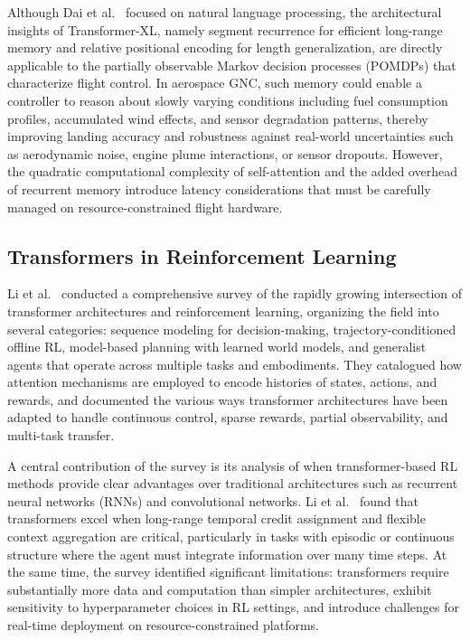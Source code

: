 \documentclass[10pt,twocolumn]{article}
\begin{document}
Although Dai et al.~\cite{dai2019} focused on natural language processing, the architectural insights of Transformer-XL, namely segment recurrence for efficient long-range memory and relative positional encoding for length generalization, are directly applicable to the partially observable Markov decision processes (POMDPs) that characterize flight control.
In aerospace GNC, such memory could enable a controller to reason about slowly varying conditions including fuel consumption profiles, accumulated wind effects, and sensor degradation patterns, thereby improving landing accuracy and robustness against real-world uncertainties such as aerodynamic noise, engine plume interactions, or sensor dropouts.
However, the quadratic computational complexity of self-attention and the added overhead of recurrent memory introduce latency considerations that must be carefully managed on resource-constrained flight hardware.

\subsection{Transformers in Reinforcement Learning}

Li et al.~\cite{li2023} conducted a comprehensive survey of the rapidly growing intersection of transformer architectures and reinforcement learning, organizing the field into several categories: sequence modeling for decision-making, trajectory-conditioned offline RL, model-based planning with learned world models, and generalist agents that operate across multiple tasks and embodiments.
They catalogued how attention mechanisms are employed to encode histories of states, actions, and rewards, and documented the various ways transformer architectures have been adapted to handle continuous control, sparse rewards, partial observability, and multi-task transfer.

A central contribution of the survey is its analysis of when transformer-based RL methods provide clear advantages over traditional architectures such as recurrent neural networks (RNNs) and convolutional networks.
Li et al.~\cite{li2023} found that transformers excel when long-range temporal credit assignment and flexible context aggregation are critical, particularly in tasks with episodic or continuous structure where the agent must integrate information over many time steps.
At the same time, the survey identified significant limitations: transformers require substantially more data and computation than simpler architectures, exhibit sensitivity to hyperparameter choices in RL settings, and introduce challenges for real-time deployment on resource-constrained platforms.
\end{document}
